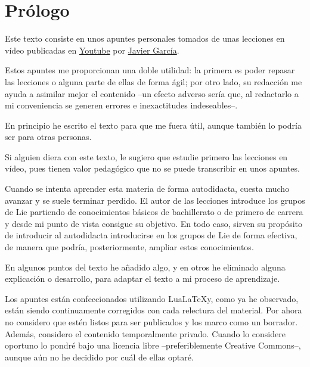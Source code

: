 \chapter{Prólogo}
Este texto consiste en unos apuntes personales tomados
de unas lecciones en vídeo publicadas en
\href{%
  https://www.youtube.com/watch?v=4NE-KNwHKSI\&list=PLAnA8FVrBl8DTFTMP8kXbDnRJHQKqfjaw
}
{Youtube}
por \href{https://www.patreon.com/JavierGarcia/}{Javier García}.

Estos apuntes me proporcionan una doble utilidad: la primera es poder repasar las lecciones o alguna parte de ellas de forma ágil; por otro lado, su redacción me ayuda a asimilar mejor el contenido --un efecto adverso sería que, al redactarlo a mi conveniencia se generen errores e inexactitudes indeseables--.

En principio he escrito el texto para que me fuera útil, aunque también lo podría ser para otras personas.

Si alguien diera con este texto, le sugiero que estudie primero las lecciones en vídeo, pues tienen valor pedagógico que no se puede transcribir en unos apuntes.

Cuando se intenta aprender esta materia de forma autodidacta, cuesta mucho avanzar y se suele terminar perdido. El autor de las lecciones introduce los grupos de Lie partiendo de conocimientos básicos de bachillerato o de primero de carrera y desde mi punto de vista consigue su objetivo. En todo caso, sirven su propósito de introducir al autodidacta introducirse en los grupos de Lie de forma efectiva, de manera que podría, posteriormente, ampliar estos conocimientos.

En algunos puntos del texto he añadido algo, y en otros he eliminado alguna explicación o desarrollo, para adaptar el texto a mi proceso de aprendizaje.

Los apuntes están confeccionados utilizando Lua\LaTeX y, como ya he observado, están siendo continuamente corregidos con cada relectura del material. Por ahora no considero que estén listos para ser publicados y los marco como un borrador. Además, considero el contenido temporalmente privado. Cuando lo considere oportuno lo pondré bajo una licencia libre --preferiblemente Creative Commons--, aunque aún no he decidido por cuál de ellas optaré.


 
